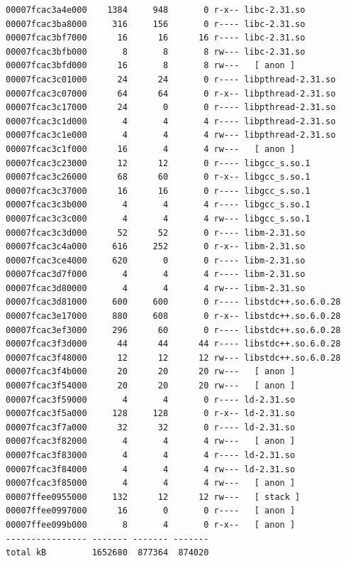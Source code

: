 \documentclass[11pt, a4paper]{article}
\begin{document}
\begin{Verbatim}[fontsize=\small]
00007fcac3a4e000    1384     948       0 r-x-- libc-2.31.so
00007fcac3ba8000     316     156       0 r---- libc-2.31.so
00007fcac3bf7000      16      16      16 r---- libc-2.31.so
00007fcac3bfb000       8       8       8 rw--- libc-2.31.so
00007fcac3bfd000      16       8       8 rw---   [ anon ]
00007fcac3c01000      24      24       0 r---- libpthread-2.31.so
00007fcac3c07000      64      64       0 r-x-- libpthread-2.31.so
00007fcac3c17000      24       0       0 r---- libpthread-2.31.so
00007fcac3c1d000       4       4       4 r---- libpthread-2.31.so
00007fcac3c1e000       4       4       4 rw--- libpthread-2.31.so
00007fcac3c1f000      16       4       4 rw---   [ anon ]
00007fcac3c23000      12      12       0 r---- libgcc_s.so.1
00007fcac3c26000      68      60       0 r-x-- libgcc_s.so.1
00007fcac3c37000      16      16       0 r---- libgcc_s.so.1
00007fcac3c3b000       4       4       4 r---- libgcc_s.so.1
00007fcac3c3c000       4       4       4 rw--- libgcc_s.so.1
00007fcac3c3d000      52      52       0 r---- libm-2.31.so
00007fcac3c4a000     616     252       0 r-x-- libm-2.31.so
00007fcac3ce4000     620       0       0 r---- libm-2.31.so
00007fcac3d7f000       4       4       4 r---- libm-2.31.so
00007fcac3d80000       4       4       4 rw--- libm-2.31.so
00007fcac3d81000     600     600       0 r---- libstdc++.so.6.0.28
00007fcac3e17000     880     608       0 r-x-- libstdc++.so.6.0.28
00007fcac3ef3000     296      60       0 r---- libstdc++.so.6.0.28
00007fcac3f3d000      44      44      44 r---- libstdc++.so.6.0.28
00007fcac3f48000      12      12      12 rw--- libstdc++.so.6.0.28
00007fcac3f4b000      20      20      20 rw---   [ anon ]
00007fcac3f54000      20      20      20 rw---   [ anon ]
00007fcac3f59000       4       4       0 r---- ld-2.31.so
00007fcac3f5a000     128     128       0 r-x-- ld-2.31.so
00007fcac3f7a000      32      32       0 r---- ld-2.31.so
00007fcac3f82000       4       4       4 rw---   [ anon ]
00007fcac3f83000       4       4       4 r---- ld-2.31.so
00007fcac3f84000       4       4       4 rw--- ld-2.31.so
00007fcac3f85000       4       4       4 rw---   [ anon ]
00007ffee0955000     132      12      12 rw---   [ stack ]
00007ffee0997000      16       0       0 r----   [ anon ]
00007ffee099b000       8       4       0 r-x--   [ anon ]
---------------- ------- ------- -------
total kB         1652680  877364  874020
\end{Verbatim}
\end{document}
